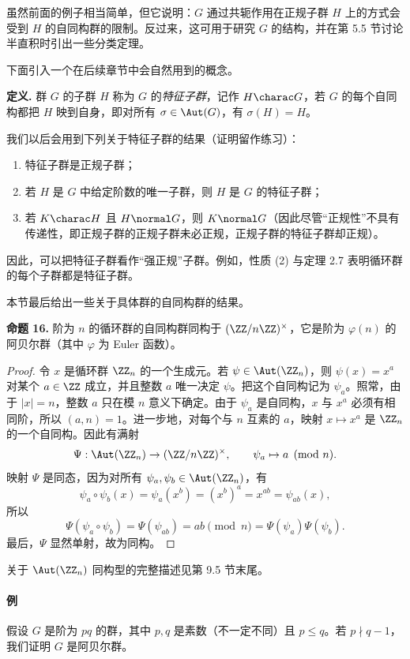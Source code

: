 虽然前面的例子相当简单，但它说明：$G$ 通过共轭作用在正规子群 $H$ 上的方式会受到 $H$ 的自同构群的限制。反过来，这可用于研究 $G$ 的结构，并在第 5.5 节讨论半直积时引出一些分类定理。

下面引入一个在后续章节中会自然用到的概念。

\noindent\textbf{定义.} 群 $G$ 的子群 $H$ 称为 $G$ 的\emph{特征子群}，记作 $H\charac G$，若 $G$ 的每个自同构都把 $H$ 映到自身，即对所有 $\sigma\in\Aut(G)$，有 $\sigma(H)=H$。

我们以后会用到下列关于特征子群的结果（证明留作练习）：
\begin{enumerate}[label=(\arabic*)]
  \item 特征子群是正规子群；
  \item 若 $H$ 是 $G$ 中给定阶数的唯一子群，则 $H$ 是 $G$ 的特征子群；
  \item 若 $K\charac H$ 且 $H\normal G$，则 $K\normal G$（因此尽管“正规性”不具有传递性，即正规子群的正规子群未必正规，正规子群的特征子群却正规）。
\end{enumerate}
因此，可以把特征子群看作“强正规”子群。例如，性质 (2) 与定理 2.7 表明循环群的每个子群都是特征子群。

本节最后给出一些关于具体群的自同构群的结果。

\medskip
\noindent\textbf{命题 16.} 阶为 $n$ 的循环群的自同构群同构于 $(\ZZ/n\ZZ)^\times$，它是阶为 $\varphi(n)$ 的阿贝尔群（其中 $\varphi$ 为 Euler 函数）。

\begin{proof}
令 $x$ 是循环群 $\ZZ_n$ 的一个生成元。若 $\psi\in\Aut(\ZZ_n)$，则 $\psi(x)=x^a$ 对某个 $a\in\ZZ$ 成立，并且整数 $a$ 唯一决定 $\psi$。把这个自同构记为 $\psi_a$。照常，由于 $|x|=n$，整数 $a$ 只在模 $n$ 意义下确定。由于 $\psi_a$ 是自同构，$x$ 与 $x^a$ 必须有相同阶，所以 $(a,n)=1$。进一步地，对每个与 $n$ 互素的 $a$，映射 $x\mapsto x^a$ 是 $\ZZ_n$ 的一个自同构。因此有满射
\[
  \Psi:\Aut(\ZZ_n)\to(\ZZ/n\ZZ)^\times,
  \qquad \psi_a\mapsto a\pmod n.
\]
映射 $\Psi$ 是同态，因为对所有 $\psi_a,
\psi_b\in\Aut(\ZZ_n)$，有
\[
  \psi_a\circ\psi_b(x)=\psi_a(x^b)=(x^b)^a=x^{ab}=\psi_{ab}(x),
\]
所以
\[
  \Psi(\psi_a\circ\psi_b)=\Psi(\psi_{ab})=ab\pmod n=\Psi(\psi_a)\Psi(\psi_b).
\]
最后，$\Psi$ 显然单射，故为同构。
\end{proof}

关于 $\Aut(\ZZ_n)$ 同构型的完整描述见第 9.5 节末尾。

\paragraph{例}
假设 $G$ 是阶为 $pq$ 的群，其中 $p,q$ 是素数（不一定不同）且 $p\leq q$。若 $p\nmid q-1$，我们证明 $G$ 是阿贝尔群。

